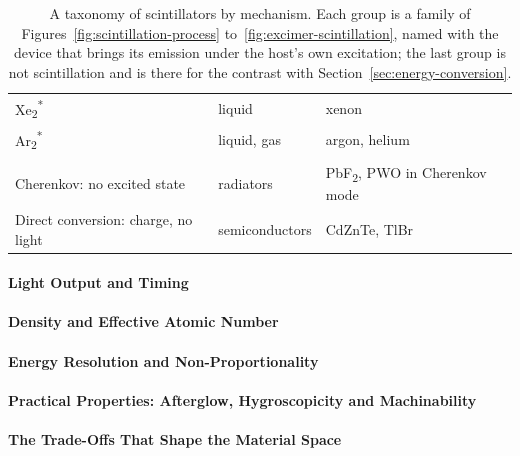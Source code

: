 \begin{table}[tbp]
\begin{tabularx}{\textwidth}{@{} >{\raggedright\arraybackslash}p{4.9cm} >{\raggedright\arraybackslash}p{4.0cm} >{\raggedright\arraybackslash}X @{}}
		\addlinespace[3pt]
		Xe\textsubscript{2}\textsuperscript{*} & liquid & xenon \\
		\addlinespace[3pt]
		Ar\textsubscript{2}\textsuperscript{*} & liquid, gas & argon, helium \\
		\midrule
		\multicolumn{3}{@{}l@{}}{\textbf{Not scintillation} --- for contrast} \\
		\addlinespace[3pt]
		Cherenkov: no excited state & radiators & PbF\textsubscript{2}, PWO in Cherenkov mode \\
		\addlinespace[3pt]
		Direct conversion: charge, no light & semiconductors & CdZnTe, TlBr \\
		\bottomrule
	\end{tabularx}
	\caption[A taxonomy of scintillators by mechanism]{%
		A taxonomy of scintillators by mechanism.
		Each group is a family of Figures~\ref{fig:scintillation-process} to~\ref{fig:excimer-scintillation}, named with the device that brings its emission under the host's own excitation; the last group is not scintillation and is there for the contrast with Section~\ref{sec:energy-conversion}.
	}
	\label{tab:scintillator-taxonomy}
\end{table}

\paragraph{Light Output and Timing}

\paragraph{Density and Effective Atomic Number}

\paragraph{Energy Resolution and Non-Proportionality}

\paragraph{Practical Properties: Afterglow, Hygroscopicity and Machinability}

\paragraph{The Trade-Offs That Shape the Material Space}

